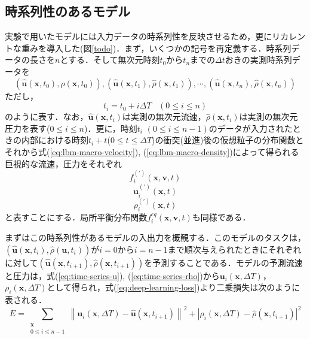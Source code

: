 \subsection{時系列性のあるモデル}
実験で用いたモデルには入力データの時系列性を反映させるため，更にリカレントな重みを導入した(図\ref{todo})．まず，いくつかの記号を再定義する．時系列データの長さを$n$とする．そして無次元時刻$t_0$から$t_n$までの$\Delta t$おきの実測時系列データを
\begin{equation}
    \left(\hat{\bm{u}}(\bm{x}, t_0), \hat{\rho}(\bm{x}, t_0)\right),
    \left(\hat{\bm{u}}(\bm{x}, t_1), \hat{\rho}(\bm{x}, t_1)\right),
    \cdots,
    \left(\hat{\bm{u}}(\bm{x}, t_n), \hat{\rho}(\bm{x}, t_n)\right)
  \label{eq:time-series-input}
\end{equation}
ただし，
\begin{equation}
  t_i = t_0 + i \Delta T \hspace{10pt} (0 \leq i \leq n)
\end{equation}
のように表す．なお，$\hat{\bm{u}}(\bm{x}, t_i)$は実測の無次元流速，$\hat{\rho}(\bm{x}, t_i)$は実測の無次元圧力を表す($0 \leq i \leq n$)．更に，時刻$t_i$ $(0 \leq i \leq n-1)$のデータが入力されたときの内部における時刻$t_i + t$($0 \leq t \leq \Delta T$)の衝突(並進)後の仮想粒子の分布関数とそれから式(\ref{eq:lbm-macro-velocity}), (\ref{eq:lbm-macro-density})によって得られる巨視的な流速，圧力をそれぞれ
\begin{equation}
  f_i^{(\prime)}(\bm{x}, \bm{v}, t)
  \label{eq:time-series-f}
\end{equation}
\begin{equation}
  \bm{u}_i^{(\prime)}(\bm{x}, t)
  \label{eq:time-series-u}
\end{equation}
\begin{equation}
  \rho_i^{(\prime)}(\bm{x}, t)
  \label{eq:time-series-rho}
\end{equation}
と表すことにする．局所平衡分布関数$f_i^{eq}(\bm{x}, \bm{v}, t)$も同様である．

まずはこの時系列性があるモデルの入出力を概観する．このモデルのタスクは，$(\hat{\bm{u}}(\bm{x}, t_i), \hat{\rho}(\bm{u}, t_i))$が$i = 0$から$i = n-1$まで順次与えられたときにそれぞれに対して$(\hat{\bm{u}}(\bm{x}, t_{i+1}), \hat{\rho}(\bm{x}, t_{i+1}))$を予測することである．モデルの予測流速と圧力は，式(\ref{eq:time-series-u}), (\ref{eq:time-series-rho})から$\bm{u}_i(\bm{x}, \Delta T)$，$\rho_i(\bm{x}, \Delta T)$として得られ，式(\ref{eq:deep-learning-loss})より二乗損失は次のように表される．
\begin{equation}
  E = \sum_{\substack{\bm{x} \\ 0 \leq i \leq n-1}} 
  \left\| \bm{u}_i(\bm{x}, \Delta T) - \hat{\bm{u}}(\bm{x}, t_{i+1}) \right\|^2 +
  \left| \rho_i(\bm{x}, \Delta T) - \hat{\rho}(\bm{x}, t_{i+1}) \right|^2
  \label{eq:error-function-time-series}
\end{equation}

